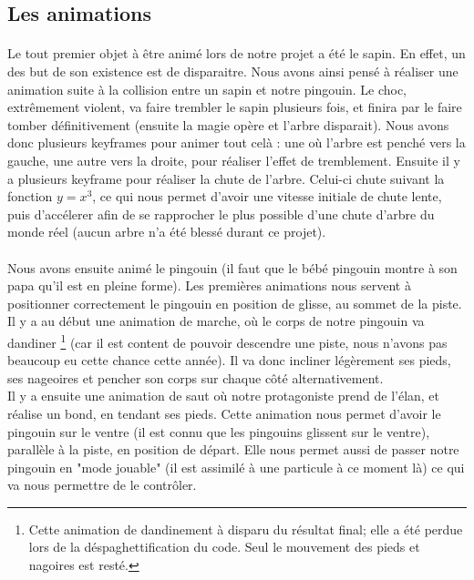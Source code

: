 \documentclass[11pt]{article}
\begin{document}
    \subsection{Les animations}

    \paragraph{}
    Le tout premier objet à être animé lors de notre projet a été le sapin. En effet, un des but de son existence est de disparaitre.
    Nous avons ainsi pensé à réaliser une animation suite à la collision entre un sapin et notre pingouin.
    Le choc, extrêmement violent, va faire trembler le sapin plusieurs fois, et finira par le faire tomber définitivement (ensuite la magie opère et l'arbre disparait).
    Nous avons donc plusieurs keyframes pour animer tout celà : une où l'arbre est penché vers la gauche, une autre vers la droite, pour réaliser l'effet de tremblement.
    Ensuite il y a plusieurs keyframe pour réaliser la chute de l'arbre.
    Celui-ci chute suivant la fonction $y=x^3$, ce qui nous permet d'avoir une vitesse initiale de chute lente, puis d'accélerer afin de se rapprocher le plus possible d'une chute d'arbre du monde réel (aucun arbre n'a été blessé durant ce projet).

    \paragraph{}
    Nous avons ensuite animé le pingouin (il faut que le bébé pingouin montre à son papa qu'il est en pleine forme).
    Les premières animations nous servent à positionner correctement le pingouin en position de glisse, au sommet de la piste.
    Il y a au début une animation de marche, où le corps de notre pingouin va dandiner \footnote{Cette animation de dandinement
    à disparu du résultat final; elle a été  perdue lors de la déspaghettification du code. Seul le mouvement des pieds et
    nagoires est resté.} (car il est content de pouvoir descendre une piste, nous n'avons pas beaucoup eu cette chance cette année).
    Il va donc incliner légèrement ses pieds, ses nageoires et pencher son corps sur chaque côté alternativement.\\
    Il y a ensuite une animation de saut où notre protagoniste prend de l'élan, et réalise un bond, en tendant ses pieds.
    Cette animation nous permet d'avoir le pingouin sur le ventre (il est connu que les pingouins glissent sur le ventre), parallèle à la piste, en position de départ.
    Elle nous permet aussi de passer notre pingouin en "mode jouable" (il est assimilé à une particule à ce moment là) ce qui va nous permettre de le contrôler.
\end{document}
